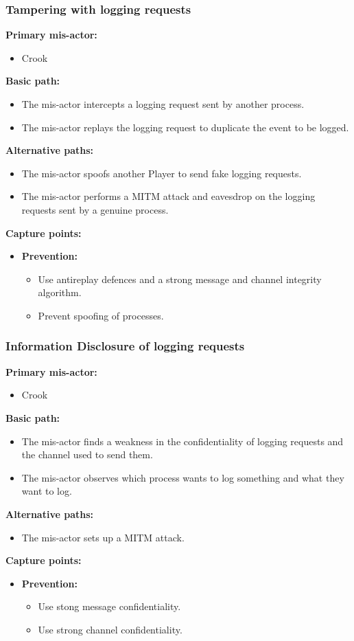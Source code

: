 \documentclass[a4paper,11pt]{report}
\begin{document}
\subsubsection{Tampering with logging requests}
\label{LoggingEngineFlowCasesT}
\textbf{Primary mis-actor:}
\begin{itemize}
\item Crook
\end{itemize}
\textbf{Basic path:}
\begin{itemize}
\item The mis-actor intercepts a logging request sent by another process.
\item The mis-actor replays the logging request to duplicate the event to be logged.
\end{itemize}
\textbf{Alternative paths:}
\begin{itemize}
\item The mis-actor spoofs another Player to send fake logging requests.
\item The mis-actor performs a MITM attack and eavesdrop on the logging requests sent by a genuine process.
\end{itemize}
\textbf{Capture points:}
\begin{itemize}
\item \textbf{Prevention:}
\begin{itemize}
\item Use antireplay defences and a strong message and channel integrity algorithm.
\item Prevent spoofing of processes.
\end{itemize}
\end{itemize}

\subsubsection{Information Disclosure of logging requests}
\label{LoggingEngineFlowCasesI}
\textbf{Primary mis-actor:}
\begin{itemize}
\item Crook
\end{itemize}
\textbf{Basic path:}
\begin{itemize}
\item The mis-actor finds a weakness in the confidentiality of logging requests and the channel used to send them.
\item The mis-actor observes which process wants to log something and what they want to log.
\end{itemize}
\textbf{Alternative paths:}
\begin{itemize}
\item The mis-actor sets up a MITM attack.
\end{itemize}
\textbf{Capture points:}
\begin{itemize}
\item \textbf{Prevention:}
\begin{itemize}
\item Use stong message confidentiality.
\item Use strong channel confidentiality.
\end{itemize}
\end{itemize}
\end{document}
